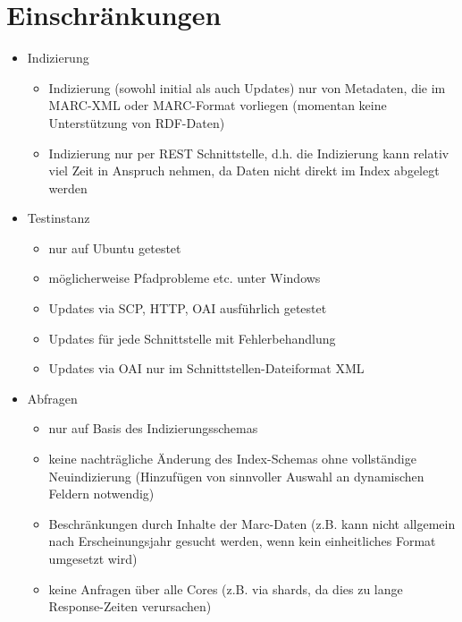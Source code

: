 \documentclass[10pt]{article}
\begin{document}
\newpage
\section{Einschränkungen}
\begin{itemize}
	\item Indizierung
	\begin{itemize}
		\item Indizierung (sowohl initial als auch Updates) nur von Metadaten, die im MARC-XML oder MARC-Format vorliegen (momentan keine Unterstützung von RDF-Daten)
		\item Indizierung nur per REST Schnittstelle, d.h. die Indizierung kann relativ viel Zeit in Anspruch nehmen, da Daten nicht direkt im Index abgelegt werden
	\end{itemize}
	
	
	\item Testinstanz
	\begin{itemize}
		\item nur auf Ubuntu getestet
		\item möglicherweise Pfadprobleme etc. unter Windows
		\item Updates via SCP, HTTP, OAI ausführlich getestet
		\item Updates für jede Schnittstelle mit Fehlerbehandlung
		\item Updates via OAI nur im Schnittstellen-Dateiformat XML
	\end{itemize}
	
	\item Abfragen
	\begin{itemize}
		\item nur auf Basis des Indizierungsschemas
		\item keine nachträgliche Änderung des Index-Schemas ohne vollständige Neuindizierung (Hinzufügen von sinnvoller Auswahl an dynamischen Feldern notwendig)
		\item Beschränkungen durch Inhalte der Marc-Daten (z.B. kann nicht allgemein nach Erscheinungsjahr gesucht werden, wenn kein einheitliches Format umgesetzt wird)
		\item keine Anfragen über alle Cores (z.B. via shards, da dies zu lange Response-Zeiten verursachen)		
	\end{itemize}
\end{itemize}
\end{document}
